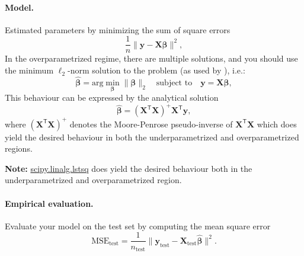 \documentclass[a4paper,10pt]{article}
\newcommand{\trnsp}{\mathsf{T}}
\newenvironment{note}
{
\begin{center}
\begin{lrbox}{\mybox}
\begin{minipage}{42em}}
{\end{minipage}
\end{lrbox}\fbox{\usebox{\mybox}}
\end{center}}
\begin{document}
\paragraph{Model.} Estimated parameters by minimizing the sum of square errors
    \begin{equation}
         \label{eq:estimation-matrix}
        \frac{1}{n}\|\textbf{y} - \textbf{X} \boldsymbol{\beta}\|^2,  
    \end{equation}
    In the overparametrized regime, there are multiple solutions, and you should use the minimum $\ell_2$-norm solution to the problem (as used by \citet{hastie_surprises_2019,belkin_reconciling_2019}), i.e.:
    \begin{equation}
    \label{eq:min-norm-solution}
    \hat{\boldsymbol{\beta}} = \text{arg}\min_{\boldsymbol{\beta}} \|\boldsymbol{\beta}\|_2 \quad \text{subject to}\quad\textbf{y} = \textbf{X} \boldsymbol{\beta},
    \end{equation}
    This behaviour can be expressed by the analytical solution
    \begin{equation}
    \label{eq:ls-sol}
    \hat{\boldsymbol{\beta}} = ( \textbf{X}^\trnsp  \textbf{X})^{+} \textbf{X}^\trnsp \textbf{y},
    \end{equation}
    where $(\textbf{X}^\trnsp  \textbf{X})^{+}$ denotes the Moore-Penrose pseudo-inverse of $\textbf{X}^\trnsp  \textbf{X}$ which does yield the desired behaviour in both the underparametrized and overparametrized regions.  
    
    \begin{note}
    \textbf{Note:} \href{https://docs.scipy.org/doc/scipy/reference/generated/scipy.linalg.lstsq.html}{scipy.linalg.lstsq} does yield the desired behaviour both in the underparametrized and overparametrized region.
    \end{note}
    
    \paragraph{Empirical evaluation.}  Evaluate your model on the test set by computing the mean square error
    \begin{equation}
         \label{eq:estimation-matrix}
        \text{MSE}_{\text{test}}  = \frac{1}{n_{\text{test}}}\|\textbf{y}_{\text{test}} - \textbf{X}_{\text{test}} \hat{\boldsymbol{\beta}}\|^2.
    \end{equation}
    
\end{document}
